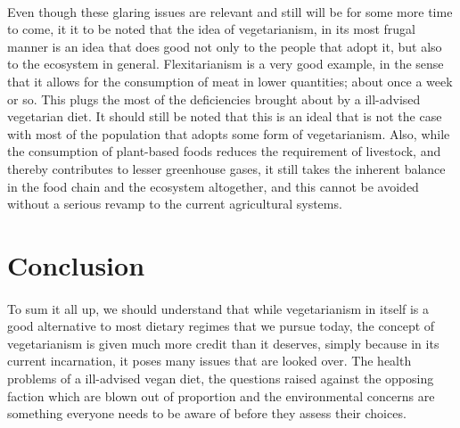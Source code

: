 \documentclass{article}
\begin{document}
\paragraph{} Even though these glaring issues are relevant and still will be for some more time to come, it it to be noted that the idea of vegetarianism, in its most frugal manner is an idea that does good not only to the people that adopt it, but also to the ecosystem in general. Flexitarianism is a very good example, in the sense that it allows for the consumption of meat in lower quantities; about once a week or so. This plugs the most of the deficiencies brought about by a ill-advised vegetarian diet. It should still be noted that this is an ideal that is not the case with most of the population that adopts some form of vegetarianism. Also, while the consumption of plant-based foods reduces the requirement of livestock, and thereby contributes to lesser greenhouse gases, it still takes the inherent balance in the food chain and the ecosystem altogether, and this cannot be avoided without a serious revamp to the current agricultural systems.

\section{Conclusion}
\paragraph{} To sum it all up, we should understand that while vegetarianism in itself is a good alternative to most dietary regimes that we pursue today, the concept of vegetarianism is given much more credit than it deserves, simply because in its current incarnation, it poses many issues that are looked over. The health problems of a ill-advised vegan diet, the questions raised against the opposing faction which are blown out of proportion and the environmental concerns are something everyone needs to be aware of before they assess their choices.

\printbibliography
\end{document}
